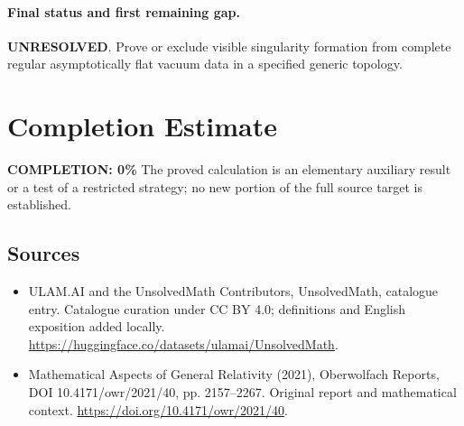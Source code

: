 \documentclass[11pt]{article}
\begin{document}
\paragraph{Final status and first remaining gap.}
\textbf{UNRESOLVED}. Prove or exclude visible singularity formation from complete regular asymptotically flat vacuum data in a specified generic topology.

\section{Completion Estimate}
\noindent\textbf{COMPLETION: 0\%}
The proved calculation is an elementary auxiliary result or a test of a restricted strategy; no new portion of the full source target is established.

\subsection{Sources}
\begin{itemize}
\item[\hypertarget{source:statement:1}{S1}] ULAM.AI and the UnsolvedMath Contributors, UnsolvedMath, catalogue entry. Catalogue curation under CC BY 4.0; definitions and English exposition added locally.
\url{https://huggingface.co/datasets/ulamai/UnsolvedMath}.
\item[\hypertarget{source:statement:2}{S2}] Mathematical Aspects of General Relativity (2021), Oberwolfach Reports, DOI 10.4171/owr/2021/40, pp. 2157--2267. Original report and mathematical context.
\url{https://doi.org/10.4171/owr/2021/40}.
\end{itemize}
\label{end:statement}
\end{document}

